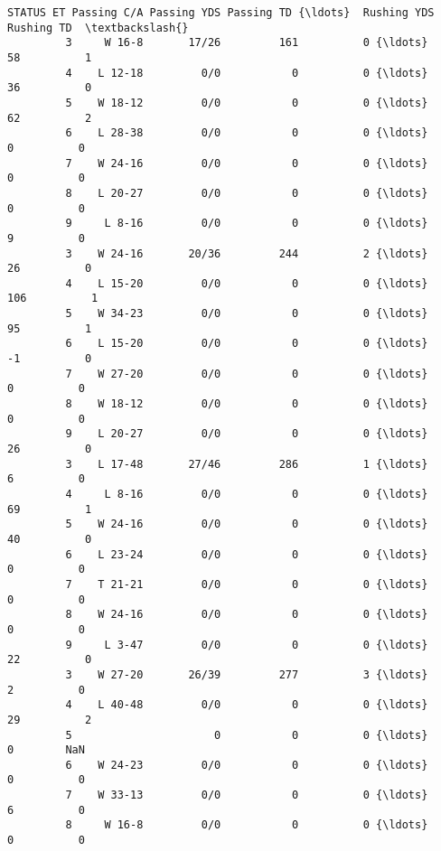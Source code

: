 \documentclass[11pt]{article}
\begin{document}
\begin{Verbatim}[commandchars=\\\{\}]
            STATUS ET Passing C/A Passing YDS Passing TD {\ldots}  Rushing YDS Rushing TD  \textbackslash{}
         3     W 16-8       17/26         161          0 {\ldots}           58          1   
         4    L 12-18         0/0           0          0 {\ldots}           36          0   
         5    W 18-12         0/0           0          0 {\ldots}           62          2   
         6    L 28-38         0/0           0          0 {\ldots}            0          0   
         7    W 24-16         0/0           0          0 {\ldots}            0          0   
         8    L 20-27         0/0           0          0 {\ldots}            0          0   
         9     L 8-16         0/0           0          0 {\ldots}            9          0   
         3    W 24-16       20/36         244          2 {\ldots}           26          0   
         4    L 15-20         0/0           0          0 {\ldots}          106          1   
         5    W 34-23         0/0           0          0 {\ldots}           95          1   
         6    L 15-20         0/0           0          0 {\ldots}           -1          0   
         7    W 27-20         0/0           0          0 {\ldots}            0          0   
         8    W 18-12         0/0           0          0 {\ldots}            0          0   
         9    L 20-27         0/0           0          0 {\ldots}           26          0   
         3    L 17-48       27/46         286          1 {\ldots}            6          0   
         4     L 8-16         0/0           0          0 {\ldots}           69          1   
         5    W 24-16         0/0           0          0 {\ldots}           40          0   
         6    L 23-24         0/0           0          0 {\ldots}            0          0   
         7    T 21-21         0/0           0          0 {\ldots}            0          0   
         8    W 24-16         0/0           0          0 {\ldots}            0          0   
         9     L 3-47         0/0           0          0 {\ldots}           22          0   
         3    W 27-20       26/39         277          3 {\ldots}            2          0   
         4    L 40-48         0/0           0          0 {\ldots}           29          2   
         5                      0           0          0 {\ldots}            0        NaN   
         6    W 24-23         0/0           0          0 {\ldots}            0          0   
         7    W 33-13         0/0           0          0 {\ldots}            6          0   
         8     W 16-8         0/0           0          0 {\ldots}            0          0   

\end{Verbatim}
\end{document}
